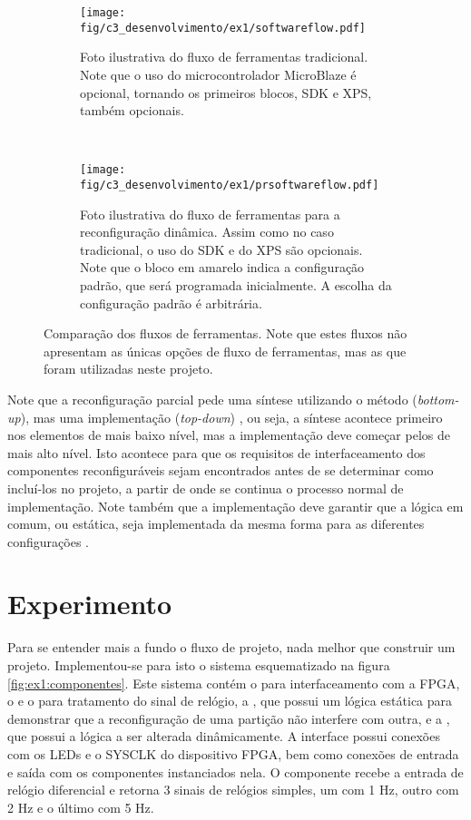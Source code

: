 \documentclass[11pt,a4paper,oneside]{book}
\begin{document}
\begin{figure}[h]
	\centering
       	\begin{subfigure}[b]{\textwidth}
       		\centering
		\texttt{[image: fig/c3\_desenvolvimento/ex1/softwareflow.pdf]}
		\caption{Foto ilustrativa do fluxo de ferramentas tradicional. Note que o uso do microcontrolador MicroBlaze é opcional, tornando os primeiros blocos, SDK e XPS, também opcionais.}
		\label{fig:ex1:softwareflow}
	\end{subfigure}\\
	\begin{subfigure}[b]{\textwidth}
		\centering
		\texttt{[image: fig/c3\_desenvolvimento/ex1/prsoftwareflow.pdf]}
		\caption{Foto ilustrativa do fluxo de ferramentas para a reconfiguração dinâmica. Assim como no caso tradicional, o uso do SDK e do XPS são opcionais. Note que o bloco em amarelo indica a configuração padrão, que será programada inicialmente. A escolha da configuração padrão é arbitrária.}
		\label{fig:ex1:prsoftwareflow}
	\end{subfigure}
	\caption{Comparação dos fluxos de ferramentas. Note que estes fluxos não apresentam as únicas opções de fluxo de ferramentas, mas as que foram utilizadas neste projeto.}
	\label{fig:ex1:softwareflow:comparacao}
\end{figure}

Note que a reconfiguração parcial pede uma síntese utilizando o método  (\textit{bottom-up}), mas uma implementação  (\textit{top-down}) \cite{ug743}, ou seja, a síntese acontece primeiro nos elementos de mais baixo nível, mas a implementação deve começar pelos de mais alto nível.
Isto acontece para que os requisitos de interfaceamento dos componentes reconfiguráveis sejam encontrados antes de se determinar como incluí-los no projeto, a partir de onde se continua o processo normal de implementação.
Note também que a implementação deve garantir que a lógica em comum, ou estática, seja implementada da mesma forma para as diferentes configurações \cite{ug702}.


\section{Experimento}
Para se entender mais a fundo o fluxo de projeto, nada melhor que construir um projeto.
Implementou-se para isto o sistema esquematizado na figura \ref{fig:ex1:componentes}.
Este sistema contém o  para interfaceamento com a FPGA, o  e o  para tratamento do sinal de relógio, a , que possui um lógica estática para demonstrar que a reconfiguração de uma partição não interfere com outra, e a , que possui a lógica a ser alterada dinâmicamente.
A interface  possui conexões com os LEDs e o SYSCLK do dispositivo FPGA, bem como conexões de entrada e saída com os componentes instanciados nela.
O componente  recebe a entrada de relógio diferencial e retorna 3 sinais de relógios simples, um com 1 Hz, outro com 2 Hz e o último com 5 Hz.
\end{document}
